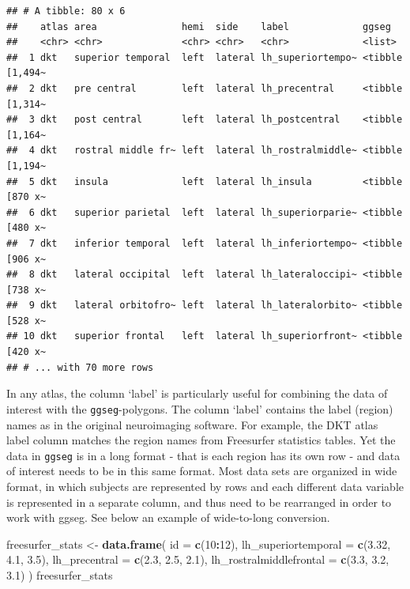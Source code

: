 \documentclass[fleqn,10pt]{wlpeerj} %
\newenvironment{Shaded}{\begin{snugshade}}{\end{snugshade}}
\newcommand{\DataTypeTok}[1]{\textcolor[rgb]{0.13,0.29,0.53}{#1}}
\newcommand{\DecValTok}[1]{\textcolor[rgb]{0.00,0.00,0.81}{#1}}
\newcommand{\FloatTok}[1]{\textcolor[rgb]{0.00,0.00,0.81}{#1}}
\newcommand{\KeywordTok}[1]{\textcolor[rgb]{0.13,0.29,0.53}{\textbf{#1}}}
\newcommand{\NormalTok}[1]{#1}
\newcommand{\OperatorTok}[1]{\textcolor[rgb]{0.81,0.36,0.00}{\textbf{#1}}}
\newcommand{\StringTok}[1]{\textcolor[rgb]{0.31,0.60,0.02}{#1}}
\begin{document}
\begin{verbatim}
## # A tibble: 80 x 6
##    atlas area               hemi  side    label             ggseg          
##    <chr> <chr>              <chr> <chr>   <chr>             <list>         
##  1 dkt   superior temporal  left  lateral lh_superiortempo~ <tibble [1,494~
##  2 dkt   pre central        left  lateral lh_precentral     <tibble [1,314~
##  3 dkt   post central       left  lateral lh_postcentral    <tibble [1,164~
##  4 dkt   rostral middle fr~ left  lateral lh_rostralmiddle~ <tibble [1,194~
##  5 dkt   insula             left  lateral lh_insula         <tibble [870 x~
##  6 dkt   superior parietal  left  lateral lh_superiorparie~ <tibble [480 x~
##  7 dkt   inferior temporal  left  lateral lh_inferiortempo~ <tibble [906 x~
##  8 dkt   lateral occipital  left  lateral lh_lateraloccipi~ <tibble [738 x~
##  9 dkt   lateral orbitofro~ left  lateral lh_lateralorbito~ <tibble [528 x~
## 10 dkt   superior frontal   left  lateral lh_superiorfront~ <tibble [420 x~
## # ... with 70 more rows
\end{verbatim}

\normalsize

In any atlas, the column `label' is particularly useful for combining the data of interest with the \texttt{ggseg}-polygons.
The column `label' contains the label (region) names as in the original neuroimaging software.
For example, the DKT atlas label column matches the region names from Freesurfer statistics tables.
Yet the data in \texttt{ggseg} is in a long format - that is each region has its own row - and data of interest needs to be in this same format.
Most data sets are organized in wide format, in which subjects are represented by rows and each different data variable is represented in a separate column, and thus need to be rearranged in order to work with ggseg.
See below an example of wide-to-long conversion.

\begin{Shaded}
\begin{Highlighting}[]
\NormalTok{freesurfer_stats <-}\StringTok{ }\KeywordTok{data.frame}\NormalTok{(}
  \DataTypeTok{id =} \KeywordTok{c}\NormalTok{(}\DecValTok{10}\OperatorTok{:}\DecValTok{12}\NormalTok{),}
  \DataTypeTok{lh_superiortemporal =} \KeywordTok{c}\NormalTok{(}\FloatTok{3.32}\NormalTok{, }\FloatTok{4.1}\NormalTok{, }\FloatTok{3.5}\NormalTok{),}
  \DataTypeTok{lh_precentral =} \KeywordTok{c}\NormalTok{(}\FloatTok{2.3}\NormalTok{, }\FloatTok{2.5}\NormalTok{, }\FloatTok{2.1}\NormalTok{),}
  \DataTypeTok{lh_rostralmiddlefrontal =} \KeywordTok{c}\NormalTok{(}\FloatTok{3.3}\NormalTok{, }\FloatTok{3.2}\NormalTok{, }\FloatTok{3.1}\NormalTok{)}
\NormalTok{  )}
\NormalTok{freesurfer_stats}
\end{Highlighting}
\end{Shaded}
\end{document}
